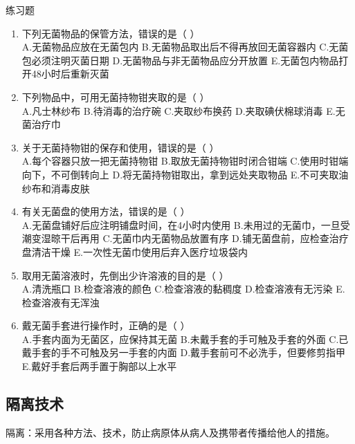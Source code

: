 \documentclass[11pt, a4paper]{ctexart}
\begin{document}
\begin{examplebox}{练习题}
	\begin{enumerate}
		\item 下列无菌物品的保管方法，错误的是（ ）\\
		      A.无菌物品应放在无菌包内 \quad B.无菌物品取出后不得再放回无菌容器内 \quad C.无菌包必须注明灭菌日期 \quad D.无菌物品与非无菌物品应分开放置 \quad E.无菌包内物品打开48小时后重新灭菌
		\item 下列物品中，可用无菌持物钳夹取的是（ ）\\
		      A.凡士林纱布 \quad B.待消毒的治疗碗 \quad C.夹取纱布换药 \quad D.夹取碘伏棉球消毒 \quad E.无菌治疗巾
		\item 关于无菌持物钳的保存和使用，错误的是（ ）\\
		      A.每个容器只放一把无菌持物钳 \quad B.取放无菌持物钳时闭合钳端 \quad C.使用时钳端向下，不可倒转向上 \quad D.将无菌持物钳取出，拿到远处夹取物品 \quad E.不可夹取油纱布和消毒皮肤
		\item 有关无菌盘的使用方法，错误的是（ ）\\
		      A.无菌盘铺好后应注明铺盘时间，在4小时内使用 \quad B.未用过的无菌巾，一旦受潮变湿晾干后再用 \quad C.无菌巾内无菌物品放置有序 \quad D.铺无菌盘前，应检查治疗盘清洁干燥 \quad E.一次性无菌巾使用后弃入医疗垃圾袋内
		\item 取用无菌溶液时，先倒出少许溶液的目的是（ ）\\
		      A.清洗瓶口 \quad B.检查溶液的颜色 \quad C.检查溶液的黏稠度 \quad D.检查溶液有无污染 \quad E.检查溶液有无浑浊
		\item 戴无菌手套进行操作时，正确的是（ ）\\
		      A.手套内面为无菌区，应保持其无菌 \quad B.未戴手套的手可触及手套的外面 \quad C.已戴手套的手不可触及另一手套的内面 \quad D.戴手套前可不必洗手，但要修剪指甲 \quad E.戴好手套后两手置于胸部以上水平
	\end{enumerate}
\end{examplebox}

\subsection{隔离技术}
隔离：采用各种方法、技术，防止病原体从病人及携带者传播给他人的措施。
\end{document}

